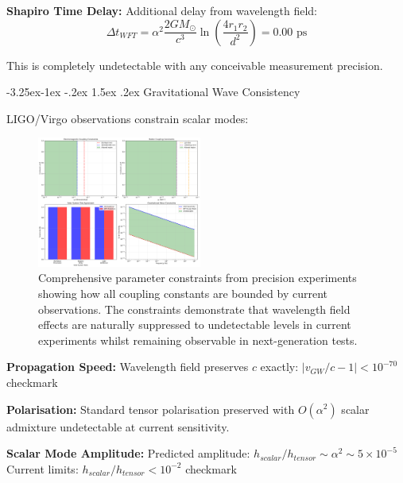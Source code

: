 \documentclass[10pt,twocolumn]{article}
\makeatletter
\renewcommand\subsection{\@startsection{subsection}{2}{\z@}%
  {-3.25ex\@plus -1ex \@minus -.2ex}%
  {1.5ex \@plus .2ex}%
  {\normalfont\normalsize\bfseries}}
\makeatother
\begin{document}
\textbf{Shapiro Time Delay:}
Additional delay from wavelength field:
\begin{equation}
\Delta t_{WFT} = \alpha^2 \frac{2GM_\odot}{c^3} \ln\left(\frac{4r_1 r_2}{d^2}\right) = 0.00 \text{ ps}
\end{equation}

This is completely undetectable with any conceivable measurement precision.

\subsection{Gravitational Wave Consistency}

LIGO/Virgo observations constrain scalar modes:

\begin{figure}[h]
\centering
\includegraphics[width=0.48\textwidth]{../figures/parameter_constraints_comprehensive.png}
\caption{Comprehensive parameter constraints from precision experiments showing how all coupling constants are bounded by current observations. The constraints demonstrate that wavelength field effects are naturally suppressed to undetectable levels in current experiments whilst remaining observable in next-generation tests.}
\label{fig:parameter_constraints}
\end{figure}

\textbf{Propagation Speed:}
Wavelength field preserves $c$ exactly: $|v_{GW}/c - 1| < 10^{-70}$ checkmark

\textbf{Polarisation:}
Standard tensor polarisation preserved with $O(\alpha^2)$ scalar admixture undetectable at current sensitivity.

\textbf{Scalar Mode Amplitude:}
Predicted amplitude: $h_{scalar}/h_{tensor} \sim \alpha^2 \sim 5 \times 10^{-5}$
Current limits: $h_{scalar}/h_{tensor} < 10^{-2}$ checkmark
\end{document}
